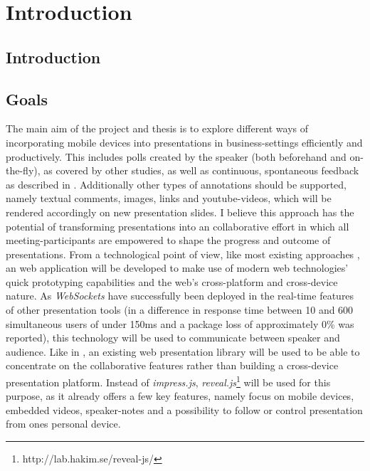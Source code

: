 \chapter{Introduction}
\label{cha:introduction}

\section{Introduction}


\section{Goals}
The main aim of the project and thesis is to explore different ways of incorporating mobile devices into presentations in business-settings efficiently and productively. This includes polls created by the speaker (both beforehand and on-the-fly), as covered by other studies, as well as continuous, spontaneous feedback as described in \cite{Teevan:MobileFeedbackDuringPresentation}. Additionally other types of annotations should be supported, namely textual comments, images, links and youtube-videos, which will be rendered accordingly on new presentation slides. I believe this approach has the potential of transforming presentations into an collaborative effort in which all meeting-participants are empowered to shape the progress and outcome of presentations. From a technological point of view, like most existing approaches \cite{Bry:Backstage, Cheng:TreebasedOnlinePresentations, Esponda:ElectronicVotingOnTheFly, Inoue:RealTimeQuestionnaire, Teevan:MobileFeedbackDuringPresentation, Triglianos:InteractiveWebPresentationsImpress}, an web application will be developed to make use of modern web technologies' quick prototyping capabilities and the web's cross-platform and cross-device nature. As \emph{WebSockets} have successfully been deployed in the real-time features of other presentation tools \cite{Inoue:RealTimeQuestionnaire, Triglianos:InteractiveWebPresentationsImpress} (in \cite{Inoue:RealTimeQuestionnaire} a difference in response time between 10 and 600 simultaneous users of under 150ms and a package loss of approximately 0\% was reported), this technology will be used to communicate between speaker and audience. Like in \cite{Triglianos:InteractiveWebPresentationsImpress}, an existing web presentation library will be used to be able to concentrate on the collaborative features rather than building a cross-device presentation platform. Instead of \emph{impress.js}, \emph{reveal.js}\footnote{http://lab.hakim.se/reveal-js/} will be used for this purpose, as it already offers a few key features, namely focus on mobile devices, embedded videos, speaker-notes and a possibility to follow or control presentation from ones personal device.